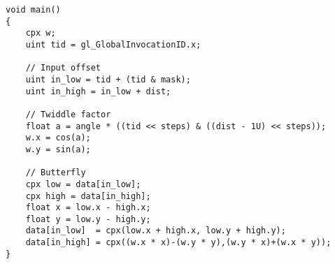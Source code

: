 \begin{lstlisting}
void main()
{
    cpx w;
    uint tid = gl_GlobalInvocationID.x;
	
    // Input offset
    uint in_low = tid + (tid & mask);
    uint in_high = in_low + dist;    
    
    // Twiddle factor
    float a = angle * ((tid << steps) & ((dist - 1U) << steps));    
    w.x = cos(a);
    w.y = sin(a);
    
    // Butterfly
    cpx low = data[in_low];
    cpx high = data[in_high];
    float x = low.x - high.x;
    float y = low.y - high.y;
    data[in_low]  = cpx(low.x + high.x, low.y + high.y);
    data[in_high] = cpx((w.x * x)-(w.y * y),(w.y * x)+(w.x * y));
}
\end{lstlisting}